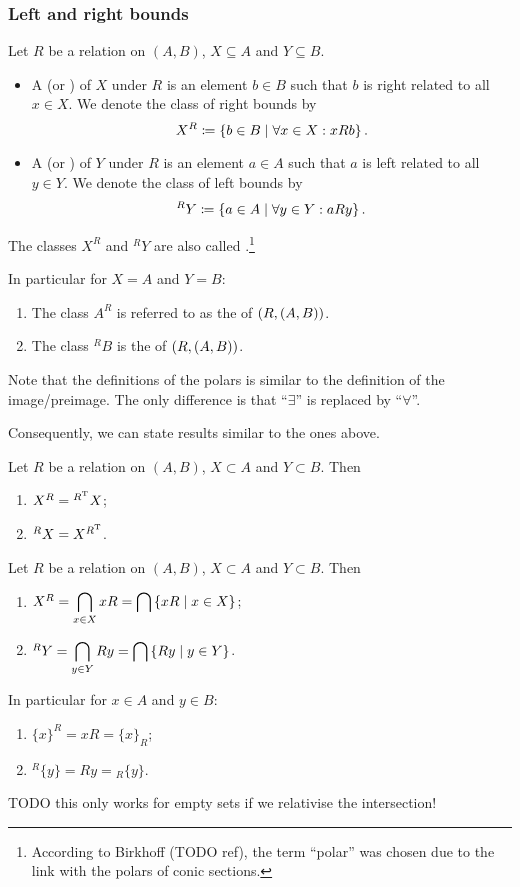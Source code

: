 \subsubsection{Left and right bounds}
\begin{definition}
Let $R$ be a relation on $(A, B)$, $X\subseteq A$ and $Y\subseteq B$.
\begin{itemize}
\item A  (or ) of $X$ under $R$ is an element $b\in B$ such that $b$ is right related to all $x\in X$. We denote the class of right bounds by
\[ X^R \coloneqq \left\{ b\in B \;\middle|\; \forall x\in X: xRb \right\}. \]
\item A  (or ) of $Y$ under $R$ is an element $a\in A$ such that $a$ is left related to all $y\in Y$. We denote the class of left bounds by
\[ ^RY \coloneqq \left\{ a\in A \;\middle|\; \forall y\in Y: aRy \right\}. \]
\end{itemize}
The classes $X^R$ and $^RY$ are also called .\footnote{According to Birkhoff (TODO ref), the term ``polar'' was chosen due to the link with the polars of conic sections.}

In particular for $X=A$ and $Y=B$:
\begin{enumerate}
\item The class $A^R$ is referred to as the  of $\left( R,(A,B) \right)$.
\item The class $^RB$ is the  of $\left( R,(A,B) \right)$.
\end{enumerate}
\end{definition}
Note that the definitions of the polars is similar to the definition of the image/preimage. The only difference is that ``$\exists$'' is replaced by ``$\forall$''.

Consequently, we can state results similar to the ones above.

\begin{lemma}
Let $R$ be a relation on $(A, B)$, $X\subset A$ and $Y\subset B$. Then
\begin{enumerate}
\item $X^R = {^{R^{\mathrm{T}}}X}$;
\item $^RX = X^{R^{\mathrm{T}}}$.
\end{enumerate}
\end{lemma}

\begin{lemma} \label{boundsFromPrincipalImages}
Let $R$ be a relation on $(A, B)$, $X\subset A$ and $Y\subset B$. Then
\begin{enumerate}
\item $X^R = \displaystyle\bigcap_{x\in X}xR = \bigcap \left\{ xR \;\middle|\; x\in X \right\}$;
\item $^RY = \displaystyle\bigcap_{y\in Y}Ry = \bigcap \left\{ Ry \;\middle|\; y\in Y \right\}$.
\end{enumerate}
In particular for $x\in A$ and $y\in B$:
\begin{enumerate}
\item $\{x\}^R = xR = \{x\}_R$;
\item $^R\{y\} = Ry = {_R\{y\}}$.
\end{enumerate}
\end{lemma}
TODO this only works for empty sets if we relativise the intersection!

